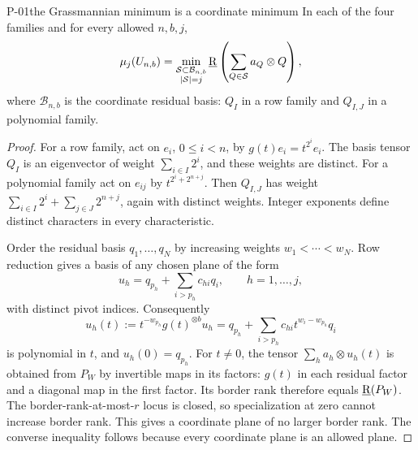 \begin{finding}{P-01}{the Grassmannian minimum is a coordinate minimum}
In each of the four families and for every allowed \(n,b,j\),
\[
 \mu_j(U_{n,b})=
 \min_{\substack{\mathcal S\subset\mathcal B_{n,b}\\|\mathcal S|=j}}
 \underline{\mathrm R}\left(\sum_{Q\in\mathcal S}a_Q\otimes Q\right),
\]
where \(\mathcal B_{n,b}\) is the coordinate residual basis: \(Q_I\)
in a row family and \(Q_{I,J}\) in a polynomial family.
\end{finding}
\begin{proof}
For a row family, act on \(e_i\), \(0\leq i<n\), by
\(g(t)e_i=t^{2^i}e_i\). The basis tensor \(Q_I\) is an eigenvector
of weight \(\sum_{i\in I}2^i\), and these weights are distinct.
For a polynomial family act on \(e_{ij}\) by
\(t^{2^i+2^{n+j}}\). Then \(Q_{I,J}\) has weight
\(\sum_{i\in I}2^i+\sum_{j\in J}2^{n+j}\), again with distinct
weights. Integer exponents define distinct characters in every
characteristic.

Order the residual basis \(q_1,\ldots,q_N\) by increasing weights
\(w_1<\cdots<w_N\). Row reduction gives a basis of any chosen plane
of the form
\[
 u_h=q_{p_h}+\sum_{i>p_h}c_{hi}q_i,\qquad h=1,\ldots,j,
\]
with distinct pivot indices. Consequently
\[
 u_h(t):=t^{-w_{p_h}}g(t)^{\otimes b}u_h
 =q_{p_h}+\sum_{i>p_h}c_{hi}t^{w_i-w_{p_h}}q_i
\]
is polynomial in \(t\), and \(u_h(0)=q_{p_h}\).
For \(t\ne0\), the tensor \(\sum_h a_h\otimes u_h(t)\) is
obtained from \(P_W\) by invertible maps in its factors: \(g(t)\)
in each residual factor and a diagonal map in the first factor.
Its border rank therefore equals \(\underline{\mathrm R}(P_W)\).
The border-rank-at-most-\(r\) locus is closed, so specialization
at zero cannot increase border rank. This gives a coordinate plane
of no larger border rank. The converse inequality follows because
every coordinate plane is an allowed plane.
\end{proof}

